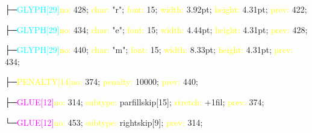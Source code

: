 \documentclass{article}
\begin{document}
\begin{nodetreeexample}
  \hspace{1em}\hspace{1em}\hspace{1em}\hspace{1em}├─\textcolor{cyan}{GLYPH[29]\hspace{1em}}\textcolor{yellow}{no:} 428; \textcolor{yellow}{char:} "r"; \textcolor{yellow}{font:} 15; \textcolor{yellow}{width:} 3.92pt; \textcolor{yellow}{height:} 4.31pt; \textcolor{yellow}{prev:} 422; \par
  \hspace{1em}\hspace{1em}\hspace{1em}\hspace{1em}├─\textcolor{cyan}{GLYPH[29]\hspace{1em}}\textcolor{yellow}{no:} 434; \textcolor{yellow}{char:} "e"; \textcolor{yellow}{font:} 15; \textcolor{yellow}{width:} 4.44pt; \textcolor{yellow}{height:} 4.31pt; \textcolor{yellow}{prev:} 428; \par
  \hspace{1em}\hspace{1em}\hspace{1em}\hspace{1em}├─\textcolor{cyan}{GLYPH[29]\hspace{1em}}\textcolor{yellow}{no:} 440; \textcolor{yellow}{char:} "m"; \textcolor{yellow}{font:} 15; \textcolor{yellow}{width:} 8.33pt; \textcolor{yellow}{height:} 4.31pt; \textcolor{yellow}{prev:} 434; \par
  \hspace{1em}\hspace{1em}\hspace{1em}\hspace{1em}├─\textcolor{yellow}{PENALTY[14]\hspace{1em}}\textcolor{yellow}{no:} 374; \textcolor{yellow}{penalty:} 10000; \textcolor{yellow}{prev:} 440; \par
  \hspace{1em}\hspace{1em}\hspace{1em}\hspace{1em}├─\textcolor{magenta}{GLUE[12]\hspace{1em}}\textcolor{yellow}{no:} 314; \textcolor{yellow}{subtype:} parfillskip[15]; \textcolor{yellow}{stretch:} +1fil; \textcolor{yellow}{prev:} 374; \par
  \hspace{1em}\hspace{1em}\hspace{1em}\hspace{1em}└─\textcolor{magenta}{GLUE[12]\hspace{1em}}\textcolor{yellow}{no:} 453; \textcolor{yellow}{subtype:} rightskip[9]; \textcolor{yellow}{prev:} 314; \par


\end{nodetreeexample}
\end{document}
